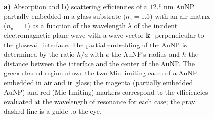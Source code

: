 \begin{figure}[b!]
    \def\svgwidth{\textwidth}
    \small
     \\[-15em]
    \hspace*{-.375\textwidth}%
        \begin{subfigure}{.765\textwidth}\caption{ }\label{sfig:IncNormal:1}\end{subfigure}%
        \begin{subfigure}{.25\textwidth}\caption{ }\label{sfig:IncNormal:2}\end{subfigure}\\[11.5em]
    \caption[Absorption and Scattering Efficiencies of a partially embedded 12.5 nm AuNP into a substrate Illuminated in an internal configuration at normal incidence]{\textbf{a)} Absorption and \textbf{b)} scattering efficiencies of a $12.5$ nm AuNP partially embedded in a glass substrate ($n_\text{s} = 1.5$) with an air matrix ($n_\text{m} = 1$) as a function of the wavelength $\lambda$ of the incident electromagnetic plane wave with a wave vector $\vb{k}^\text{i}$ perpendicular to the glass-air interface. The partial embedding of the AuNP is determined by the ratio $h/a$ with $a$ the AuNP's radius and $h$ the distance between the interface and the center of the AuNP. The green shaded region shows the two Mie-limiting cases of a AuNP embedded in air and in glass; the magenta (partially embedded AuNP) and red (Mie-limiting) markers correspond to the efficiencies evaluated at the wavelength of resonance for each case; the gray dashed line is a guide to the eye.}
    \label{fig:Inc:Eff}
\end{figure}

